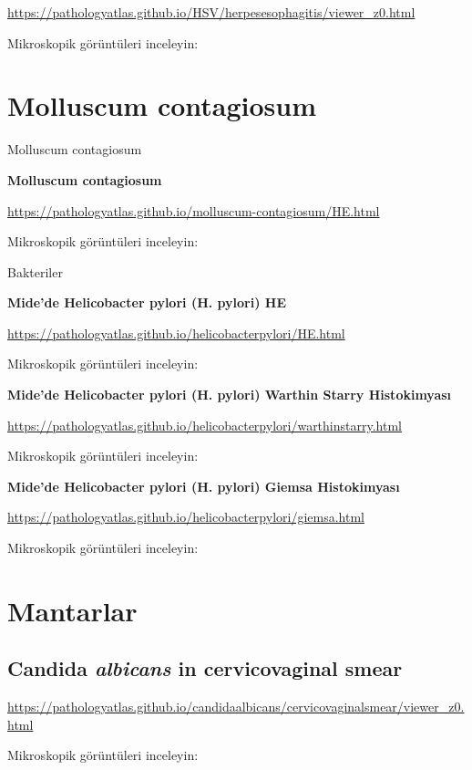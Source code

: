 \documentclass[
  letterpaper,
  DIV=11,
  numbers=noendperiod]{scrreprt}
\begin{document}
\url{https://pathologyatlas.github.io/HSV/herpesesophagitis/viewer_z0.html}

Mikroskopik görüntüleri inceleyin:

\hypertarget{molluscum-contagiosum}{%
\chapter{Molluscum contagiosum}\label{molluscum-contagiosum}}

Molluscum contagiosum

\textbf{Molluscum contagiosum}

\url{https://pathologyatlas.github.io/molluscum-contagiosum/HE.html}

Mikroskopik görüntüleri inceleyin:

Bakteriler

\textbf{Mide'de Helicobacter pylori (H. pylori) HE}

\url{https://pathologyatlas.github.io/helicobacterpylori/HE.html}

Mikroskopik görüntüleri inceleyin:

\textbf{Mide'de Helicobacter pylori (H. pylori) Warthin Starry
Histokimyası}

\url{https://pathologyatlas.github.io/helicobacterpylori/warthinstarry.html}

Mikroskopik görüntüleri inceleyin:

\textbf{Mide'de Helicobacter pylori (H. pylori) Giemsa Histokimyası}

\url{https://pathologyatlas.github.io/helicobacterpylori/giemsa.html}

Mikroskopik görüntüleri inceleyin:

\hypertarget{mantarlar}{%
\chapter{Mantarlar}\label{mantarlar}}

\hypertarget{candida-albicans-in-cervicovaginal-smear}{%
\section{\texorpdfstring{Candida \emph{albicans} in cervicovaginal
smear}{Candida albicans in cervicovaginal smear}}\label{candida-albicans-in-cervicovaginal-smear}}

\url{https://pathologyatlas.github.io/candidaalbicans/cervicovaginalsmear/viewer_z0.html}

Mikroskopik görüntüleri inceleyin:
\end{document}

